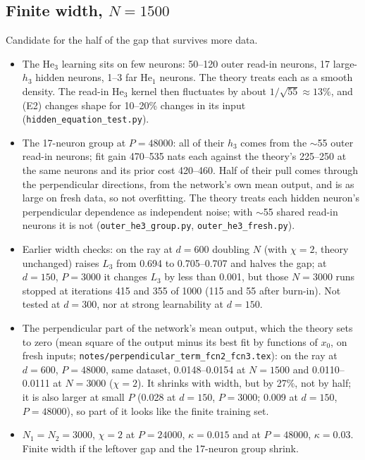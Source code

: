 \documentclass[11pt,a4paper]{article}
\newcommand{\munclear}{\textcolor{unclear}{\Large\textbf{?}}}
\newcommand{\mtodo}{\textcolor{neutral}{\Large$\square$}}
\newcommand{\unclear}{\item[\munclear]}
\newcommand{\todo}{\item[\mtodo]}
\begin{document}
\subsection*{Finite width, $N=1500$}
Candidate for the half of the gap that survives more data.
\begin{itemize}
\unclear The $\mathrm{He}_3$ learning sits on few neurons: 50--120 outer read-in neurons, 17 large-$h_3$ hidden
  neurons, 1--3 far $\mathrm{He}_1$ neurons. The theory treats each as a smooth density. The read-in $\mathrm{He}_3$
  kernel then fluctuates by about $1/\sqrt{55}\approx13\%$, and (E2) changes shape for 10--20\% changes in its input
  (\texttt{hidden\_equation\_test.py}).
\unclear The 17-neuron group at $P=48000$: all of their $h_3$ comes from the $\sim$55 outer read-in neurons; fit gain
  470--535 nats each against the theory's 225--250 at the same neurons and its prior cost 420--460. Half of their
  pull comes through the perpendicular directions, from the network's own mean output, and is as large on fresh
  data, so not overfitting. The theory treats each hidden neuron's perpendicular dependence as independent noise;
  with $\sim$55 shared read-in neurons it is not (\texttt{outer\_he3\_group.py}, \texttt{outer\_he3\_fresh.py}).
\unclear Earlier width checks: on the ray at $d=600$ doubling $N$ (with $\chi=2$, theory unchanged) raises $L_3$ from
  0.694 to 0.705--0.707 and halves the gap; at $d=150$, $P=3000$ it changes $L_3$ by less than 0.001, but those
  $N=3000$ runs stopped at iterations 415 and 355 of 1000 (115 and 55 after burn-in). Not tested at $d=300$, nor at
  strong learnability at $d=150$.
\unclear The perpendicular part of the network's mean output, which the theory sets to zero (mean square of the
  output minus its best fit by functions of $x_0$, on fresh inputs; \texttt{notes/perpendicular\_term\_fcn2\_fcn3.tex}):
  on the ray at $d=600$, $P=48000$, same dataset, 0.0148--0.0154 at $N=1500$ and 0.0110--0.0111 at $N=3000$
  ($\chi=2$). It shrinks with width, but by 27\%, not by half; it is also larger at small $P$ (0.028 at $d=150$,
  $P=3000$; 0.009 at $d=150$, $P=48000$), so part of it looks like the finite training set.
\todo $N_1=N_2=3000$, $\chi=2$ at $P=24000$, $\kappa=0.015$ and at $P=48000$, $\kappa=0.03$. Finite width if the
  leftover gap and the 17-neuron group shrink.
\end{itemize}
\end{document}
